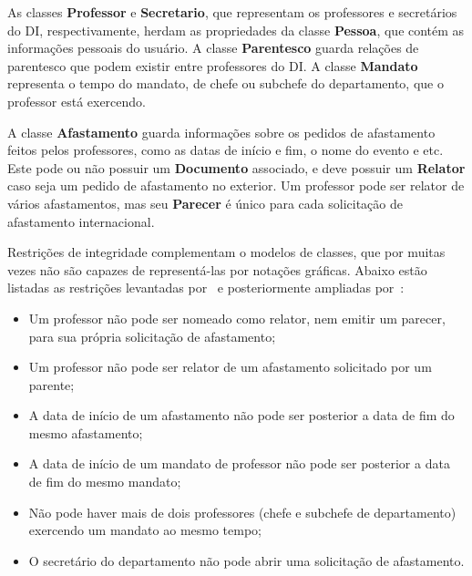 As classes \textbf{Professor} e \textbf{Secretario}, que representam os professores
e secretários do DI, respectivamente, herdam as propriedades da classe \textbf{Pessoa},
que contém as informações pessoais do usuário. A classe \textbf{Parentesco} 
guarda relações de parentesco que podem existir entre professores do DI.
A classe \textbf{Mandato} representa o tempo do mandato, de chefe ou subchefe do departamento,
que o professor está exercendo.

A classe \textbf{Afastamento} guarda informações sobre os pedidos de afastamento
feitos pelos professores, como as datas de início e fim, o nome do evento e etc.
Este pode ou não possuir um \textbf{Documento} associado, e deve possuir um \textbf{Relator}
caso seja um pedido de afastamento no exterior. Um professor pode ser relator de vários afastamentos,
mas seu \textbf{Parecer} é único para cada solicitação de afastamento internacional.


Restrições de integridade complementam o modelos de classes, que por muitas vezes não são
capazes de representá-las por notações gráficas. Abaixo estão listadas as restrições
levantadas por~ e posteriormente ampliadas por~:

\begin{itemize}
    \item Um professor não pode ser nomeado como relator, nem emitir um parecer, para sua própria solicitação de afastamento;
    \item Um professor não pode ser relator de um afastamento solicitado por um parente;
    \item A data de início de um afastamento não pode ser posterior a data de fim do mesmo afastamento;
    \item A data de início de um mandato de professor não pode ser posterior a data de fim do mesmo mandato;
    \item Não pode haver mais de dois professores (chefe e subchefe de departamento) exercendo um mandato ao mesmo tempo;
    \item O secretário do departamento não pode abrir uma solicitação de afastamento.
\end{itemize}
